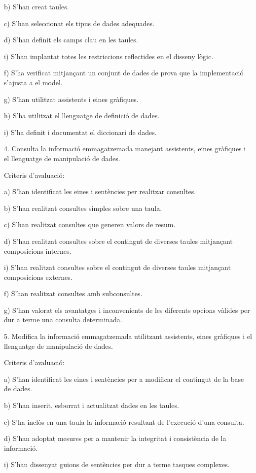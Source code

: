 \documentclass[catalan, a4paper, 12pt, titlepage]{article}
\begin{document}
b) S'han creat taules.

c) S'han seleccionat els tipus de dades adequades.

d) S'han definit els camps clau en les taules.

i) S'han implantat totes les restriccions reflectides en el disseny lògic.

f) S'ha verificat mitjançant un conjunt de dades de prova que la implementació s'ajusta a el model.

g) S'han utilitzat assistents i eines gràfiques.

h) S'ha utilitzat el llenguatge de definició de dades.

i) S'ha definit i documentat el diccionari de dades.

4. Consulta la informació emmagatzemada manejant assistents, eines gràfiques i el llenguatge de manipulació de dades.

Criteris d'avaluació:

a) S'han identificat les eines i sentències per realitzar consultes.

b) S'han realitzat consultes simples sobre una taula.

c) S'han realitzat consultes que generen valors de resum.

d) S'han realitzat consultes sobre el contingut de diverses taules mitjançant composicions internes.

i) S'han realitzat consultes sobre el contingut de diverses taules mitjançant composicions externes.

f) S'han realitzat consultes amb subconsultes.

g) S'han valorat els avantatges i inconvenients de les diferents opcions vàlides per dur a terme una consulta determinada.

5. Modifica la informació emmagatzemada utilitzant assistents, eines gràfiques i el llenguatge de manipulació de dades.

Criteris d'avaluació:

a) S'han identificat les eines i sentències per a modificar el contingut de la base de dades.

b) S'han inserit, esborrat i actualitzat dades en les taules.

c) S'ha inclòs en una taula la informació resultant de l'execució d'una consulta.

d) S'han adoptat mesures per a mantenir la integritat i consistència de la informació.

i) S'han dissenyat guions de sentències per dur a terme tasques complexes.
\end{document}
